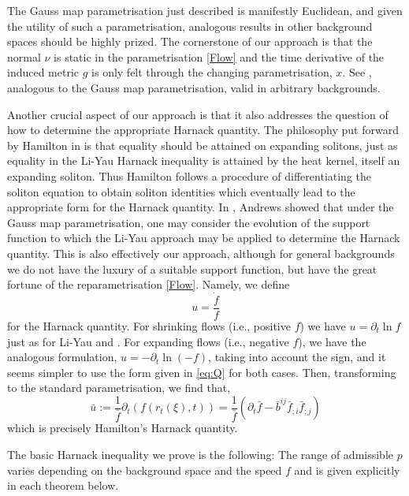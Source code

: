 The Gauss map parametrisation just described is manifestly Euclidean, and given the utility of such a parametrisation, analogous results in other background spaces should be highly prized. The cornerstone of our approach is that the normal \(\nu\) is static in the parametrisation \eqref{Flow} and the time derivative of the induced metric \(g\) is only felt through the changing parametrisation, $x$. See , analogous to the Gauss map parametrisation, valid in arbitrary backgrounds.

Another crucial aspect of our approach is that it also addresses the question of how to determine the appropriate Harnack quantity. The philosophy put forward by Hamilton in \cite{Hamilton:/1995,Hamilton:/1993} is that equality should be attained on expanding solitons, just as equality in the Li-Yau Harnack inequality \cite{LiYau:/1986} is attained by the heat kernel, itself an expanding soliton. Thus Hamilton follows a procedure of differentiating the soliton equation to obtain soliton identities which eventually lead to the appropriate form for the Harnack quantity. In \cite{Andrews:09/1994}, Andrews showed that under the Gauss map parametrisation, one may consider the evolution of the support function to which the Li-Yau approach may be applied to determine the Harnack quantity. This is also effectively our approach, although for general backgrounds we do not have the luxury of a suitable support function, but have the great fortune of the reparametrisation \eqref{Flow}. Namely, we define
\begin{equation}
\label{eq:Q}
u = \frac{\dot{f}}{f}
\end{equation}
for the Harnack quantity. For shrinking flows (i.e., positive $f$) we have $u = \partial_t \ln f$ just as for Li-Yau \cite{LiYau:/1986} and \cite{Andrews:09/1994}. For expanding flows (i.e., negative $f$), we have the analogous formulation, $u = - \partial_t \ln (-f)$, taking into account the sign, and it seems simpler to use the form given in \eqref{eq:Q} for both cases. Then, transforming to the standard parametrisation, we find that,
\[
\bar{u} := \frac{1}{\bar{f}} \partial_t \left(f(r_t(\xi), t)\right) = \frac{1}{\bar{f}} \left(\partial_t\bar{f} - \bar{b}^{ij} \bar{f}_{;i} \bar{f}_{;j}\right)
\]
which is precisely Hamilton's Harnack quantity.

The basic Harnack inequality we prove is the following:
The range of admissible $p$ varies depending on the background space and the speed $f$ and is given explicitly in each theorem below.




